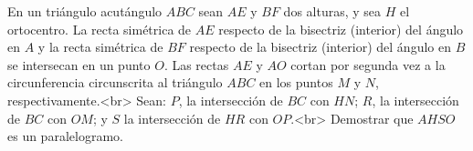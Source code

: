 En un triángulo acutángulo $ABC$ sean $AE$ y $BF$ dos alturas, y sea $H$ el ortocentro. La recta simétrica de $AE$ respecto de la bisectriz (interior) del ángulo en $A$ y la recta simétrica de $BF$ respecto de la bisectriz (interior) del ángulo en $B$ se intersecan en un punto $O$. Las rectas $AE$ y $AO$ cortan por segunda vez a la circunferencia circunscrita al triángulo $ABC$ en los puntos $M$ y $N$, respectivamente.<br>
Sean: $P$, la intersección de $BC$ con $HN$; $R$, la intersección de $BC$ con $OM$; y $S$ la intersección de $HR$ con $OP$.<br>
Demostrar que $AHSO$ es un paralelogramo.
